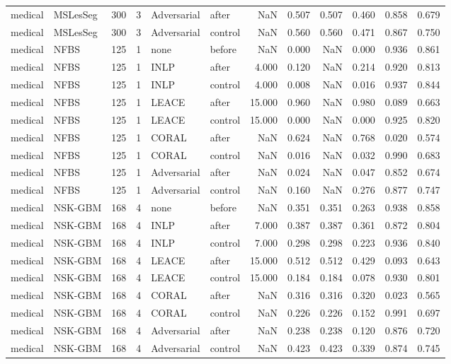 \begin{tabular}{llrrllrrrrrr}
medical & MSLesSeg & 300 & 3 & Adversarial & after & NaN & 0.507 & 0.507 & 0.460 & 0.858 & 0.679 \\
medical & MSLesSeg & 300 & 3 & Adversarial & control & NaN & 0.560 & 0.560 & 0.471 & 0.867 & 0.750 \\
medical & NFBS & 125 & 1 & none & before & NaN & 0.000 & NaN & 0.000 & 0.936 & 0.861 \\
medical & NFBS & 125 & 1 & INLP & after & 4.000 & 0.120 & NaN & 0.214 & 0.920 & 0.813 \\
medical & NFBS & 125 & 1 & INLP & control & 4.000 & 0.008 & NaN & 0.016 & 0.937 & 0.844 \\
medical & NFBS & 125 & 1 & LEACE & after & 15.000 & 0.960 & NaN & 0.980 & 0.089 & 0.663 \\
medical & NFBS & 125 & 1 & LEACE & control & 15.000 & 0.000 & NaN & 0.000 & 0.925 & 0.820 \\
medical & NFBS & 125 & 1 & CORAL & after & NaN & 0.624 & NaN & 0.768 & 0.020 & 0.574 \\
medical & NFBS & 125 & 1 & CORAL & control & NaN & 0.016 & NaN & 0.032 & 0.990 & 0.683 \\
medical & NFBS & 125 & 1 & Adversarial & after & NaN & 0.024 & NaN & 0.047 & 0.852 & 0.674 \\
medical & NFBS & 125 & 1 & Adversarial & control & NaN & 0.160 & NaN & 0.276 & 0.877 & 0.747 \\
medical & NSK-GBM & 168 & 4 & none & before & NaN & 0.351 & 0.351 & 0.263 & 0.938 & 0.858 \\
medical & NSK-GBM & 168 & 4 & INLP & after & 7.000 & 0.387 & 0.387 & 0.361 & 0.872 & 0.804 \\
medical & NSK-GBM & 168 & 4 & INLP & control & 7.000 & 0.298 & 0.298 & 0.223 & 0.936 & 0.840 \\
medical & NSK-GBM & 168 & 4 & LEACE & after & 15.000 & 0.512 & 0.512 & 0.429 & 0.093 & 0.643 \\
medical & NSK-GBM & 168 & 4 & LEACE & control & 15.000 & 0.184 & 0.184 & 0.078 & 0.930 & 0.801 \\
medical & NSK-GBM & 168 & 4 & CORAL & after & NaN & 0.316 & 0.316 & 0.320 & 0.023 & 0.565 \\
medical & NSK-GBM & 168 & 4 & CORAL & control & NaN & 0.226 & 0.226 & 0.152 & 0.991 & 0.697 \\
medical & NSK-GBM & 168 & 4 & Adversarial & after & NaN & 0.238 & 0.238 & 0.120 & 0.876 & 0.720 \\
medical & NSK-GBM & 168 & 4 & Adversarial & control & NaN & 0.423 & 0.423 & 0.339 & 0.874 & 0.745 \\

\end{tabular}
